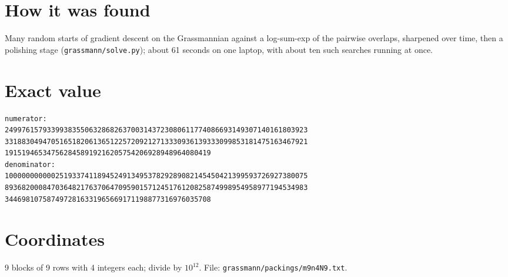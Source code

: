 \documentclass[11pt,a4paper]{article}
\begin{document}
\section{How it was found}
Many random starts of gradient descent on the Grassmannian against a log-sum-exp of the pairwise overlaps, sharpened over time, then a polishing stage (\texttt{grassmann/solve.py}); about 61 seconds on one laptop, with about ten such searches running at once.


\appendix
\section{Exact value}
{\small
\begin{verbatim}
numerator:
249976157933993835506328682637003143723080611774086693149307140161803923
331883049470516518206136512257209212713330936139333099853181475163467921
1915194653475628458919216205754206928948964080419
denominator:
100000000000251933741189452491349537829289082145450421399593726927380075
893682000847036482176370647095901571245176120825874998954958977194534983
3446981075874972816331965669171198877316976035708
\end{verbatim}}

\section{Coordinates}
9 blocks of 9 rows with 4 integers each; divide by $10^{12}$. File: \texttt{grassmann/packings/m9n4N9.txt}.
{\tiny
\begin{multicols}{3}
\end{multicols}}
\end{document}
